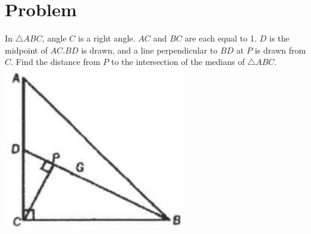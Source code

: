 \documentclass{article}
\begin{document}
\section*{Problem}
In \(\triangle A B C\), angle \(C\) is a right angle. \(A C\) and \(B C\) are each equal to 1. \(D\) is the midpoint of \(A C . B D\) is drawn, and a line perpendicular to \(B D\) at \(P\) is drawn from \(C\). Find the distance from \(P\) to the intersection of the medians of \(\triangle A B C\).\\
\centering
\includegraphics[width=\textwidth]{images/016(4).jpg}
\end{document}
